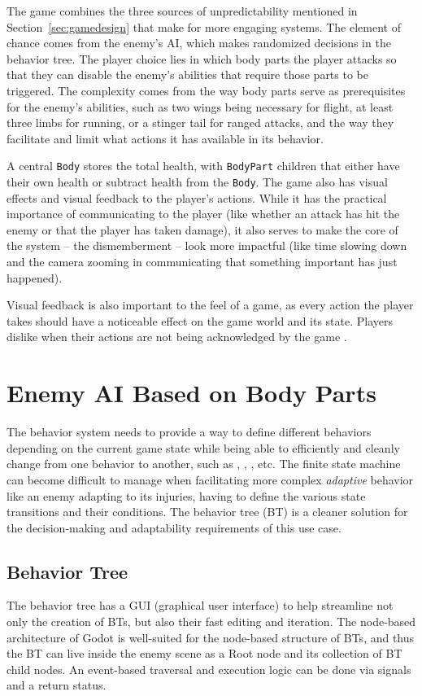 The game combines the three sources of unpredictability mentioned in Section~\ref{sec:gamedesign} that make for more engaging systems. The element of chance comes from the enemy's AI, which makes randomized decisions in the behavior tree. The player choice lies in which body parts the player attacks so that they can disable the enemy's abilities that require those parts to be triggered. The complexity comes from the way body parts serve as prerequisites for the enemy's abilities, such as two wings being necessary for flight, at least three limbs for running, or a stinger tail for ranged attacks, and the way they facilitate and limit what actions it has available in its behavior.

A central \texttt{Body} stores the total health, with \texttt{BodyPart} children that either have their own health or subtract health from the \texttt{Body}.
The game also has visual effects and visual feedback to the player's actions. While it has the practical importance of communicating to the player (like whether an attack has hit the enemy or that the player has taken damage), it also serves to make the core of the system -- the dismemberment -- look more impactful (like time slowing down and the camera zooming in communicating that something important has just happened).

Visual feedback is also important to the feel of a game, as every action the player takes should have a noticeable effect on the game world and its state. Players dislike when their actions are not being acknowledged by the game \cite{Orselli_NewellFun}.


\section{Enemy AI Based on Body Parts}
The behavior system needs to provide a way to define different behaviors depending on the current game state while being able to efficiently and cleanly change from one behavior to another, such as , , , etc. The finite state machine can become difficult to manage when facilitating more complex \emph{adaptive} behavior like an enemy adapting to its injuries, having to define the various state transitions and their conditions. The behavior tree (BT) is a cleaner solution for the decision-making and adaptability requirements of this use case.

\subsection{Behavior Tree}
The behavior tree has a GUI (graphical user interface) to help streamline not only the creation of BTs, but also their fast editing and iteration. The node-based architecture of Godot is well-suited for the node-based structure of BTs, and thus the BT can live inside the enemy scene as a Root node and its collection of BT child nodes. An event-based traversal and execution logic can be done via signals and a return status.

